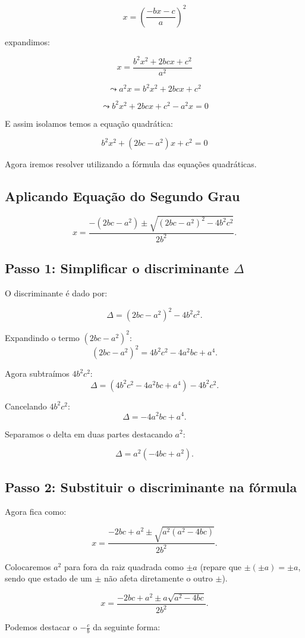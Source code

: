 \documentclass{article}
\begin{document}
\[
x= \left( \frac{-bx - c}{a}\right)^2
\]

expandimos:

\[
x= \frac{b^2x^2+ 2bcx+c^2}{a^2}
\]

\[
\leadsto
a^2 x= b^2x^2+ 2bcx+c^2
\]

\[
\leadsto
b^2x^2+ 2bcx+c^2 - a^2x = 0
\]

E assim isolamos temos a equação quadrática:

\[
b^2x^2+ (2bc-a^2)x+c^2 = 0
\]

Agora iremos resolver utilizando a fórmula das equações quadráticas.

\subsection{Aplicando Equação do Segundo Grau}

\[
x = \frac{-(2bc - a^2) \pm \sqrt{(2bc - a^2)^2 - 4b^2c^2}}{2b^2}.
\]

\subsection{Passo 1: Simplificar o discriminante $\Delta$}
O discriminante é dado por:

\[
\Delta = (2bc - a^2)^2 - 4b^2c^2.
\]

Expandindo o termo $(2bc - a^2)^2$:
\[
(2bc - a^2)^2 = 4b^2c^2 - 4a^2bc + a^4.
\]

Agora subtraímos $4b^2c^2$:
\[
\Delta = (4b^2c^2 - 4a^2bc + a^4) - 4b^2c^2.
\]

Cancelando $4b^2c^2$:
\[
\Delta = -4a^2bc + a^4.
\]

Separamos o delta em duas partes destacando $a^2$:

\[
\Delta = a^2(-4bc + a^2).
\]

\subsection{Passo 2: Substituir o discriminante na fórmula}
Agora fica como:

\[
x = \frac{-2bc + a^2 \pm \sqrt{a^2(a^2-4bc)}}{2b^2}.
\]

Colocaremos $a^2$ para fora da raiz quadrada como $\pm a$ (repare que $\pm (\pm a) = \pm a$, sendo que estado de um $\pm$ não afeta diretamente o outro $\pm$).

\[
x = \frac{-2bc + a^2 \pm a\sqrt{a^2-4bc}}{2b^2}.
\]

Podemos destacar o $- \frac{c}{b}$ da seguinte forma:
\end{document}
